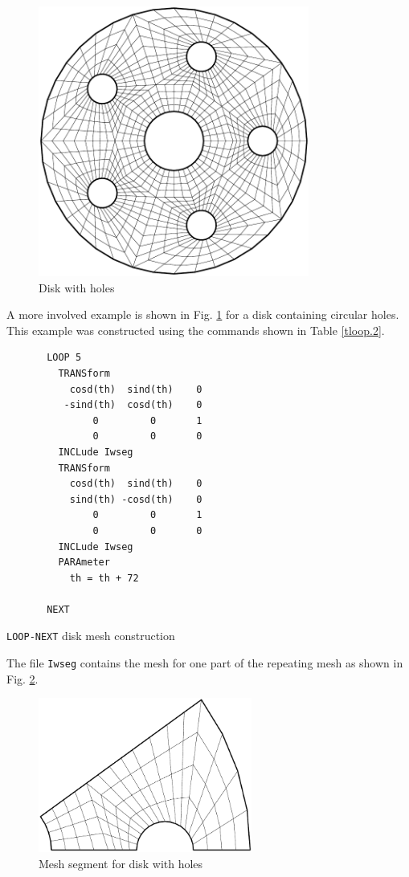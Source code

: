 \begin{figure}[ht!]
\centerline {\hfil \includegraphics[height=3.5in]{figs/wheel5} \hfil}
\caption{Disk with holes \label{floop1}}
\end{figure}
A more involved example is shown
in Fig. \ref{floop1} for a disk containing circular holes.  This
example was constructed using the commands shown in Table \ref{tloop.2}.
\begin{table}[ht!]
\begin{center}
\begin{verbatim}
       LOOP 5
         TRANSform
           cosd(th)  sind(th)    0
          -sind(th)  cosd(th)    0
               0         0       1
               0         0       0
         INCLude Iwseg
         TRANSform
           cosd(th)  sind(th)    0
           sind(th) -cosd(th)    0
               0         0       1
               0         0       0
         INCLude Iwseg
         PARAmeter
           th = th + 72

       NEXT
\end{verbatim}
\caption{\texttt{LOOP-NEXT} disk mesh construction \label{tloop.2}}
\end{center}
\end{table}
The file \texttt{Iwseg} contains the mesh for one part of the repeating
mesh as shown in Fig. \ref{floop2}.
\begin{figure}[ht!]
\centerline {\hfil \includegraphics[height=2.0in]{figs/wheelsg} \hfil}
\caption{Mesh segment for disk with holes \label{floop2}}
\end{figure}

